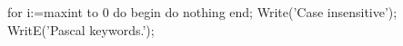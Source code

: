 \documentclass[10pt,a4paper]{article}
\begin{document}
\begin{lstlistingFRAMED}
for i:=maxint to 0 do begin
{
	do nothing
}
end;
Write('Case insensitive'); 
WritE('Pascal keywords.');
\end{lstlistingFRAMED}
\end{document}
